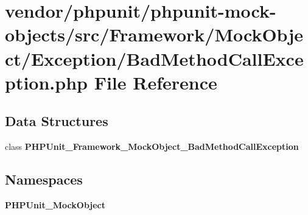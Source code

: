 \section{vendor/phpunit/phpunit-\/mock-\/objects/src/\+Framework/\+Mock\+Object/\+Exception/\+Bad\+Method\+Call\+Exception.php File Reference}
\label{_bad_method_call_exception_8php}
\subsection*{Data Structures}
\begin{DoxyCompactItemize}
\item 
class {\bf P\+H\+P\+Unit\+\_\+\+Framework\+\_\+\+Mock\+Object\+\_\+\+Bad\+Method\+Call\+Exception}
\end{DoxyCompactItemize}
\subsection*{Namespaces}
\begin{DoxyCompactItemize}
\item 
 {\bf P\+H\+P\+Unit\+\_\+\+Mock\+Object}
\end{DoxyCompactItemize}
